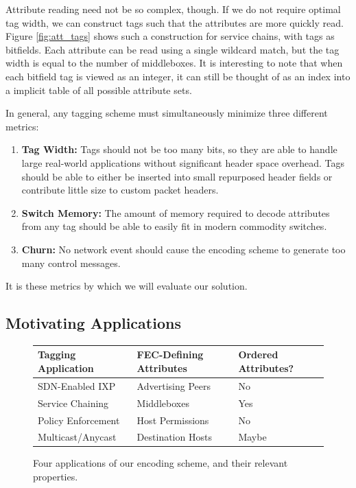 Attribute reading need not be so complex, though. If we do not require optimal tag width, we can construct tags such that the attributes are more quickly read. Figure \ref{fig:att_tags} shows such a construction for service chains, with tags as bitfields. Each attribute can be read using a single wildcard match, but the tag width is equal to the number of middleboxes. It is interesting to note that when each bitfield tag is viewed as an integer, it can still be thought of as an index into a implicit table of all possible attribute sets. 

In general, any tagging scheme must simultaneously minimize three different metrics:
\begin{enumerate}
\item{\textbf{Tag Width:} Tags should not be too many bits, so they are able to handle large real-world applications without significant header space overhead. Tags should be able to either be inserted into small repurposed header fields or contribute little size to custom packet headers. }
\item{\textbf{Switch Memory:} The amount of memory required to decode attributes from any tag should be able to easily fit in modern commodity switches.}
\item{\textbf{Churn:} No network event should cause the encoding scheme to generate too many control messages.}
\end{enumerate}
It is these metrics by which we will evaluate our solution. 


\subsection{Motivating Applications}
\begin{figure}
    \begin{tabular}{| p{2.5cm} | p{2cm} | p{2cm} |}
    \hline
    Tagging Application & FEC-Defining Attributes & Ordered Attributes?\\ \hline
    SDN-Enabled IXP & Advertising Peers & No \\ \hline
    Service Chaining & Middleboxes& Yes \\ \hline
    Policy Enforcement & Host Permissions & No \\ \hline
    Multicast/Anycast & Destination Hosts & Maybe \\
    \hline
    \end{tabular}
    \caption{Four applications of our encoding scheme, and their relevant properties. } 
    \label{tab:applications}
\end{figure}

